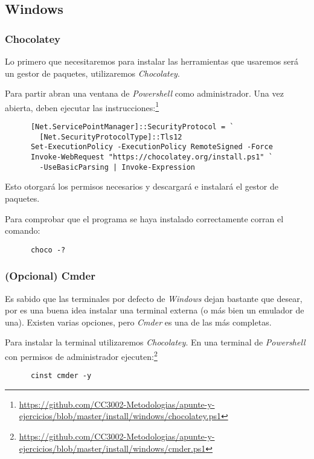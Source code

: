 \subsection{Windows}
  \subsubsection{Chocolatey}
    Lo primero que necesitaremos para instalar las herramientas que usaremos será un gestor de 
    paquetes, utilizaremos \textit{Chocolatey}.\autocite{choco}

    Para partir abran una ventana de \textit{Powershell} como administrador.
    Una vez abierta, deben ejecutar las instrucciones:\footnote{
      \url{https://github.com/CC3002-Metodologias/apunte-y-ejercicios/blob/master/install/windows/chocolatey.ps1}
    }
    \begin{verbatim}
      [Net.ServicePointManager]::SecurityProtocol = `
        [Net.SecurityProtocolType]::Tls12
      Set-ExecutionPolicy -ExecutionPolicy RemoteSigned -Force
      Invoke-WebRequest "https://chocolatey.org/install.ps1" `
        -UseBasicParsing | Invoke-Expression
    \end{verbatim}

    Esto otorgará los permisos necesarios y descargará e instalará el gestor de paquetes.

    Para comprobar que el programa se haya instalado correctamente corran el comando:
    \begin{verbatim}
      choco -?
    \end{verbatim}

  \subsubsection{(Opcional) Cmder}
    Es sabido que las terminales por defecto de \textit{Windows} dejan bastante que desear, 
    por es una buena idea instalar una terminal externa (o más bien un emulador de una).
    Existen varias opciones, pero \textit{Cmder} es una de las más completas.

    Para instalar la terminal utilizaremos \textit{Chocolatey}.
    En una terminal de \textit{Powershell} con permisos de administrador ejecuten:\footnote{
      \url{https://github.com/CC3002-Metodologias/apunte-y-ejercicios/blob/master/install/windows/cmder.ps1}
    }

    \begin{verbatim}
      cinst cmder -y
    \end{verbatim}

